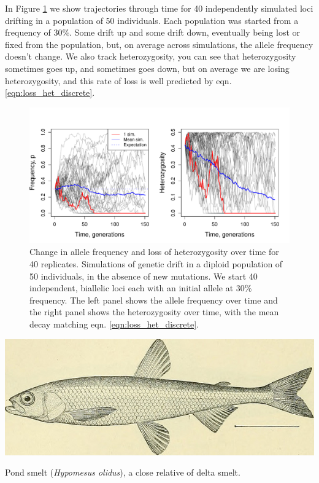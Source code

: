 In Figure \ref{fig:LossHet_WF_N50} we show trajectories through time for 40 independently simulated loci drifting in a population of 50 individuals. Each population was started from a frequency of $30\%$. Some drift up and some drift down, eventually being lost or fixed from the population, but, on average across simulations, the allele frequency doesn't change. We also track heterozygosity, you can see that heterozygosity sometimes goes up, and sometimes goes down, but on average we are losing heterozygosity, and this rate of loss is well predicted by eqn. \eqref{eqn:loss_het_discrete}.
\begin{figure}
\begin{center}
\includegraphics[width= \textwidth]{figures/WF_loss_het/WF_loss_het_N50.pdf}
\end{center}
\caption{Change in allele frequency and loss of heterozygosity over time for 40 replicates. Simulations of genetic drift in a diploid population of 50 individuals, in the absence of new mutations. We start 40 independent, biallelic loci each with an initial allele at 30\% frequency. The left panel shows the allele frequency over time and the right panel shows the heterozygosity over time, with the mean decay matching eqn. \eqref{eqn:loss_het_discrete}. } \label{fig:LossHet_WF_N50}
\end{figure}


\begin{marginfigure}
\begin{center}
\includegraphics[width= \textwidth]{illustration_images/Genetic_drift/smelt/20497452375_9be855d9ff_z.jpg}
\end{center}
\caption{Pond smelt ({\it Hypomesus olidus}), a close relative of delta smelt. } \label{fig:smelt}
\end{marginfigure}

